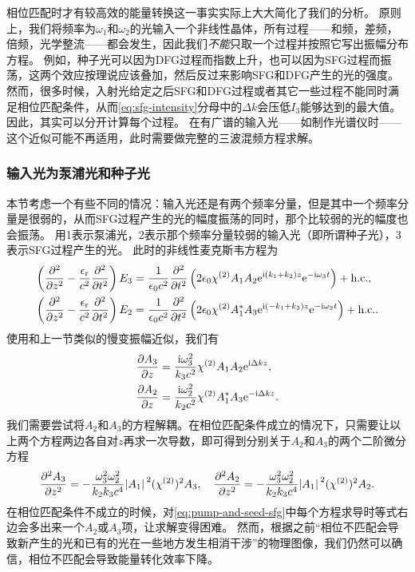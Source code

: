 相位匹配时才有较高效的能量转换这一事实实际上大大简化了我们的分析。
原则上，我们将频率为$\omega_1$和$\omega_2$的光输入一个非线性晶体，所有过程——和频，差频，倍频，光学整流——都会发生，因此我们\emph{不能}只取一个过程并按照它写出振幅分布方程。
例如，种子光可以因为DFG过程而指数上升，也可以因为SFG过程而振荡，这两个效应按理说应该叠加，然后反过来影响SFG和DFG产生的光的强度。
然而，很多时候，入射光给定之后SFG和DFG过程或者其它一些过程不能同时满足相位匹配条件，从而\eqref{eq:sfg-intensity}分母中的$\Delta k$会压低$I_3$能够达到的最大值。
因此，其实可以分开计算每个过程。
在有广谱的输入光——如制作光谱仪时——这个近似可能不再适用，此时需要做完整的三波混频方程求解。

\subsubsection{输入光为泵浦光和种子光}

本节考虑一个有些不同的情况：输入光还是有两个频率分量，但是其中一个频率分量是很弱的，从而SFG过程产生的光的幅度振荡的同时，那个比较弱的光的幅度也会振荡。
用1表示泵浦光，2表示那个频率分量较弱的输入光（即所谓种子光），3表示SFG过程产生的光。
此时的非线性麦克斯韦方程为
\[
    \begin{aligned}
        \left( \pdv[2]{z} - \frac{\epsilon_\text{r}}{c^2} \pdv[2]{t} \right) E_3 &= \frac{1}{\epsilon_0 c^2} \pdv[2]{t} \left( 2 \epsilon_0  \chi^{(2)} A_1 A_2 \mathrm{e}^{\mathrm{i} (k_1 + k_2) z} \mathrm{e}^{-\mathrm{i} \omega_3 t} \right) + \text{h.c.}, \\
        \left( \pdv[2]{z} - \frac{\epsilon_\text{r}}{c^2} \pdv[2]{t} \right) E_2 &= \frac{1}{\epsilon_0 c^2} \pdv[2]{t} \left( 2 \epsilon_0  \chi^{(2)} A_1^* A_3 \mathrm{e}^{\mathrm{i} (- k_1 + k_3) z} \mathrm{e}^{-\mathrm{i} \omega_2 t} \right) + \text{h.c.}.
    \end{aligned}
\]
使用和上一节类似的慢变振幅近似，我们有
\begin{equation}
    \begin{aligned}
        \pdv{A_3}{z} &= \frac{\mathrm{i} \omega_3^2}{k_3 c^2} \chi^{(2)} A_1 A_2 \mathrm{e}^{\mathrm{i} \Delta k z}, \\
        \pdv{A_2}{z} &= \frac{\mathrm{i} \omega_2^2}{k_2 c^2} \chi^{(2)} A_1^* A_3 \mathrm{e}^{- \mathrm{i} \Delta k z}.
    \end{aligned}
    \label{eq:pump-and-seed-sfg}
\end{equation}
我们需要尝试将$A_2$和$A_3$的方程解耦。在相位匹配条件成立的情况下，只需要让以上两个方程两边各自对$z$再求一次导数，即可得到分别关于$A_2$和$A_3$的两个二阶微分方程
\[
    \pdv[2]{A_3}{z} = - \frac{\omega_3^2 \omega_2^2}{k_2 k_3 c^4} \abs*{A_1}^2 (\chi^{(2)})^2 A_3, \quad \pdv[2]{A_2}{z} = - \frac{\omega_3^2 \omega_2^2}{k_2 k_3 c^4} \abs*{A_1}^2 (\chi^{(2)})^2 A_2.
\]
在相位匹配条件不成立的时候，对\eqref{eq:pump-and-seed-sfg}中每个方程求导时等式右边会多出来一个$A_2$或$A_3$项，让求解变得困难。
然而，根据之前“相位不匹配会导致新产生的光和已有的光在一些地方发生相消干涉”的物理图像，我们仍然可以确信，相位不匹配会导致能量转化效率下降。

